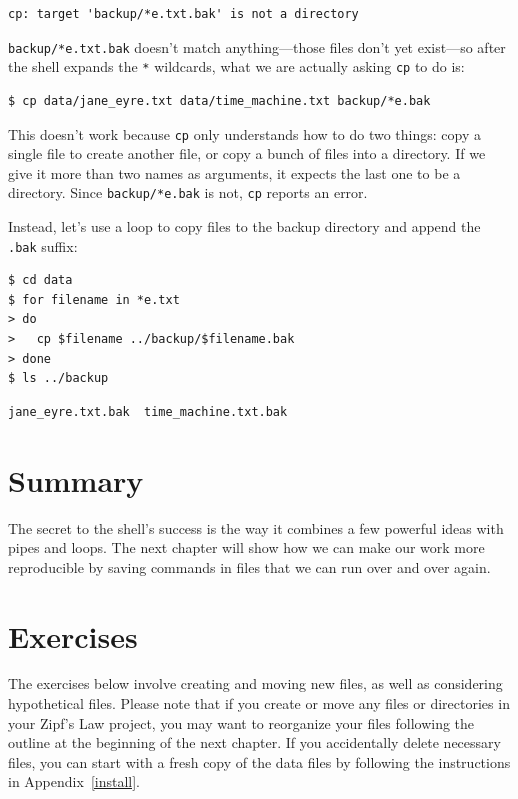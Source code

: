 \documentclass[
]{krantz}
\begin{document}
\begin{verbatim}
cp: target 'backup/*e.txt.bak' is not a directory
\end{verbatim}

\texttt{backup/*e.txt.bak} doesn't match anything---those files don't yet exist---so
after the shell expands the \texttt{*} wildcards,
what we are actually asking \texttt{cp} to do is:

\begin{verbatim}
$ cp data/jane_eyre.txt data/time_machine.txt backup/*e.bak
\end{verbatim}

This doesn't work because \texttt{cp} only understands how to do two things:
copy a single file to create another file,
or copy a bunch of files into a directory.
If we give it more than two names as arguments,
it expects the last one to be a directory.
Since \texttt{backup/*e.bak} is not,
\texttt{cp} reports an error.

Instead,
let's use a loop to copy files to the backup directory
and append the \texttt{.bak} suffix:

\begin{verbatim}
$ cd data
$ for filename in *e.txt
> do
>   cp $filename ../backup/$filename.bak
> done
$ ls ../backup
\end{verbatim}

\begin{verbatim}
jane_eyre.txt.bak  time_machine.txt.bak
\end{verbatim}

\hypertarget{bash-tools-summary}{%
\section{Summary}\label{bash-tools-summary}}

The secret to the shell's success is the way it combines a few powerful ideas with pipes and loops.
The next chapter will show how we can make our work more reproducible
by saving commands in files that we can run over and over again.

\hypertarget{bash-tools-exercises}{%
\section{Exercises}\label{bash-tools-exercises}}

The exercises below involve creating and moving new files,
as well as considering hypothetical files.
Please note that if you create or move any files or directories in your Zipf's Law project,
you may want to reorganize your files following the outline at the beginning of the next chapter.
If you accidentally delete necessary files,
you can start with a fresh copy of the data files
by following the instructions in Appendix~\ref{install}.
\end{document}
